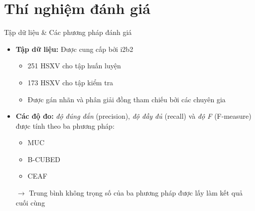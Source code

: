 \section{Thí nghiệm đánh giá}
\begin{frame}{Tập dữ liệu \& Các phương pháp đánh giá}
\putlogo
\begin{itemize}
	\item \textbf{Tập dữ liệu:} Được cung cấp bởi i2b2
	\begin{itemize}
		\item 251 HSXV cho tập huấn luyện
		\item 173 HSXV cho tập kiểm tra
		\item Được gán nhãn và phân giải đồng tham chiếu bởi các chuyên gia
	\end{itemize}
	\item \textbf{Các độ đo:} \emph{độ đúng đắn} (precision), \emph{độ đầy đủ} (recall) và \emph{độ F} (F-measure) được tính theo ba phương pháp:
	\begin{itemize}
		\item MUC
		\item B-CUBED
		\item CEAF
	\end{itemize}
	\item[\boldmath$\rightarrow$] Trung bình không trọng số của ba phương pháp được lấy làm kết quả cuối cùng
\end{itemize}
\end{frame}


